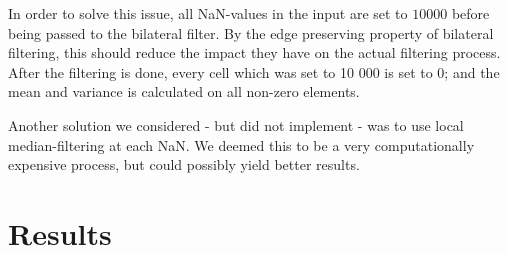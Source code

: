 \documentclass[11pt]{article}
\begin{document}
  In order to solve this issue, all NaN-values in the input are set to $10000$ before being passed to the bilateral filter. By the edge preserving property of bilateral filtering, this should reduce the impact they have on the actual filtering process. After the filtering is done, every cell which was set to 10 000 is set to 0; and the mean and variance is calculated on all non-zero elements. \par
  Another solution we considered - but did not implement - was to use local median-filtering at each NaN. We deemed this to be a very computationally expensive process, but could possibly yield better results. \par

\section{Results}


\end{document}
